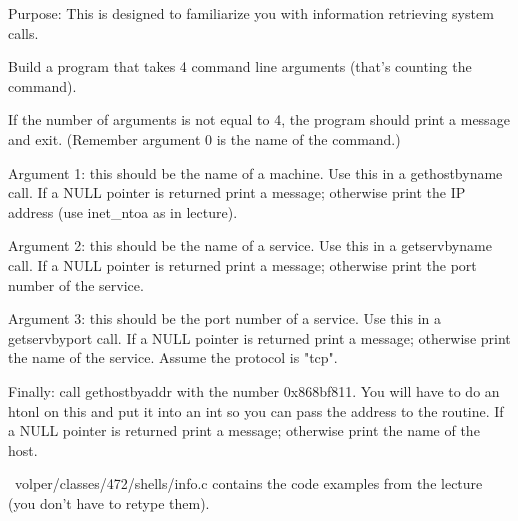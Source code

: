 

\parindent 0pt

Purpose: This is designed to familiarize you with information
retrieving system calls.

Build a program that takes 4 command line arguments
(that's counting the command).

If the number of arguments is not equal to 4, the program
should print a message and exit.
(Remember argument 0 is the name of the command.)

Argument 1: this should be the name of a machine.
Use this in a {\ltt{}gethostbyname} call.
If a {\ltt{}NULL} pointer is returned print a message;
otherwise print the IP address (use {\ltt{}inet_ntoa} as in lecture).

Argument 2: this should be the name of a service.
Use this in a {\ltt{}getservbyname} call.
If a {\ltt{}NULL} pointer is returned print a message;
otherwise print the port number of the service.

Argument 3: this should be the port number of a service.
Use this in a {\ltt{}getservbyport} call.
If a {\ltt{}NULL} pointer is returned print a message;
otherwise print the name of the service.
Assume the protocol is {\ltt{}"tcp"}.

Finally: call {\ltt{}gethostbyaddr} with the number
{\ltt{}0x868bf811}. You will have to do an {\ltt{}htonl}
on this and put it into an {\ltt{}int} so you can pass the
address to the routine.
If a {\ltt{}NULL} pointer is returned print a message;
otherwise print the name of the host.

{\ltt{}~volper/classes/472/shells/info.c} contains 
the code examples from the lecture
(you don't have to retype them).
\bye
